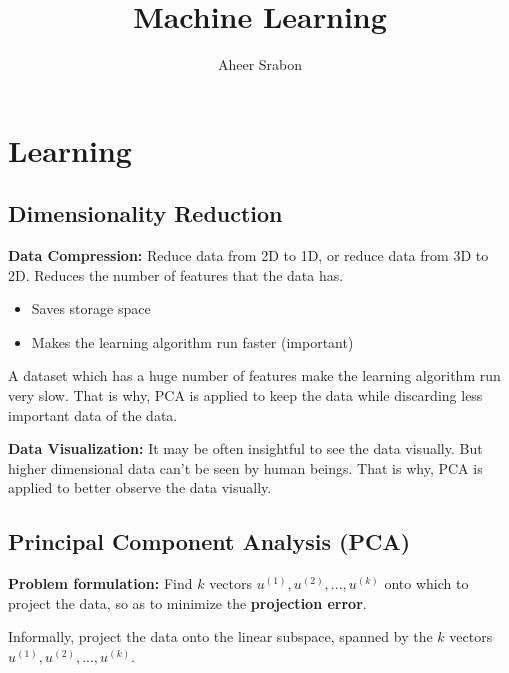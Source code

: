 

\title{Machine Learning}
\author{Aheer Srabon}


\maketitle

\section*{Learning}

\subsection*{Dimensionality Reduction}
\noindent \textbf{Data Compression: } Reduce data from 2D to 1D,
or reduce data from 3D to 2D. Reduces the number of features
that the data has.
\begin{itemize}
\itemsep0em
	\item Saves storage space
	\item Makes the learning algorithm run faster (important)
\end{itemize}
\vspace{0.5em}
\noindent A dataset which has a huge number of features make the
learning algorithm run very slow. That is why, PCA is applied to
keep the data while discarding less important data of the data.

\vspace{0.5cm}

\noindent \textbf{Data Visualization: } It may be often insightful
to see the data visually. But higher dimensional data can't be
seen by human beings. That is why, PCA is applied to better observe
the data visually.

\subsection*{Principal Component Analysis (PCA)}

\noindent \textbf{Problem formulation: } Find $ k $ vectors 
$ u^{(1)}, u^{(2)}, ... , u^{(k)} $ onto which to project the data, so
as to  minimize the \textbf{projection error}.

\vspace{0.3cm}

\noindent Informally, project the data onto the linear subspace,
spanned by the $ k $ vectors $ u^{(1)}, u^{(2)}, ... , u^{(k)} $.

